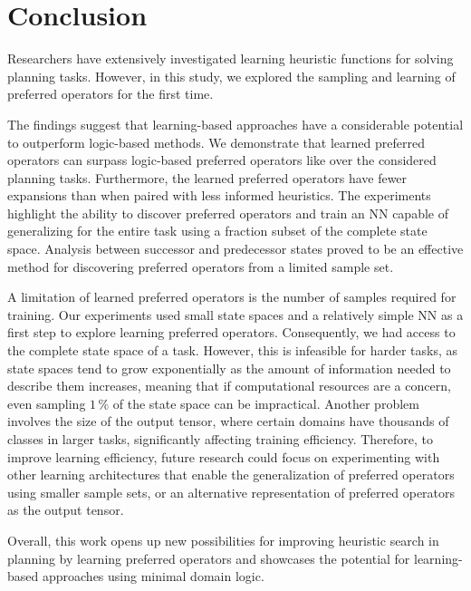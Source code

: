 \documentclass[ppgc,diss,english]{iiufrgs}
\begin{document}
\chapter{Conclusion}
\label{cha:conclusion}
Researchers have extensively investigated learning heuristic functions for solving planning tasks.
However, in this study, we explored the sampling and learning of preferred operators for the first time.

The findings suggest that learning-based approaches have a considerable potential to outperform logic-based methods. We demonstrate that learned preferred operators can surpass logic-based preferred operators like \poff over the considered planning tasks. Furthermore, the learned preferred operators have fewer expansions than \poff when paired with less informed heuristics.
The experiments highlight the ability to discover preferred operators and train an NN capable of generalizing for the entire task using a fraction subset of the complete state space. Analysis between successor and predecessor states proved to be an effective method for discovering preferred operators from a limited sample set.

A limitation of learned preferred operators is the number of samples required for training. Our experiments used small state spaces and a relatively simple NN as a first step to explore learning preferred operators. Consequently, we had access to the complete state space of a task. However, this is infeasible for harder tasks, as state spaces tend to grow exponentially as the amount of information needed to describe them increases, meaning that if computational resources are a concern, even sampling $1\,\%$ of the state space can be impractical.
Another problem involves the size of the output tensor, where certain domains have thousands of classes in larger tasks, significantly affecting training efficiency.
Therefore, to improve learning efficiency, future research could focus on experimenting with other learning architectures that enable the generalization of preferred operators using smaller sample sets, or an alternative representation of preferred operators as the output tensor.

Overall, this work opens up new possibilities for improving heuristic search in planning by learning preferred operators and showcases the potential for learning-based approaches using minimal domain logic.




\appendix
\end{document}
